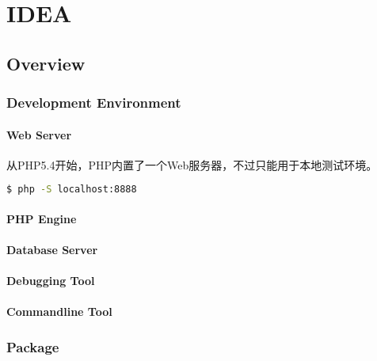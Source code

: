 \part{IDEA}


\chapter{Overview}




\section{Development Environment}


\subsection{Web Server}

从PHP5.4开始，PHP内置了一个Web服务器，不过只能用于本地测试环境。

\begin{lstlisting}[language=bash]
$ php -S localhost:8888
\end{lstlisting}


\subsection{PHP Engine}



\subsection{Database Server}



\subsection{Debugging Tool}



\subsection{Commandline Tool}






\section{Package}



